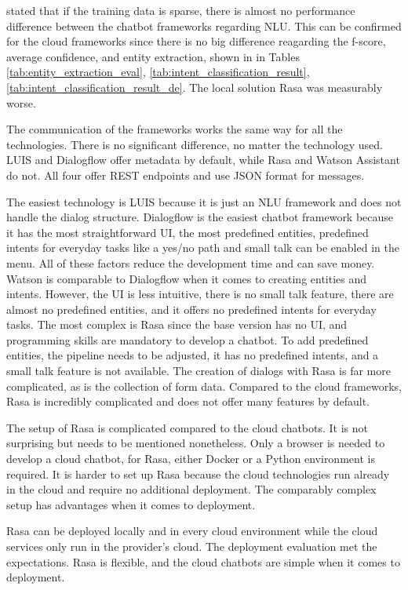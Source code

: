 \citet{braunEvaluatingNLU} stated that if the training data is sparse, there is almost no performance difference between the chatbot frameworks regarding NLU.
This can be confirmed for the cloud frameworks since there is no big difference reagarding the f-score, average confidence, and entity extraction, shown in in Tables \ref{tab:entity_extraction_eval}, \ref{tab:intent_classification_result}, \ref{tab:intent_classification_result_de}.
The local solution Rasa was measurably worse.

The communication of the frameworks works the same way for all the technologies.
There is no significant difference, no matter the technology used.
LUIS and Dialogflow offer metadata by default, while Rasa and Watson Assistant do not.
All four offer REST endpoints and use JSON format for messages.

The easiest technology is LUIS because it is just an NLU framework and does not handle the dialog structure.
Dialogflow is the easiest chatbot framework because it has the most straightforward UI, the most predefined entities,
predefined intents for everyday tasks like a yes/no path and small talk can be enabled in the menu.
All of these factors reduce the development time and can save money.
Watson is comparable to Dialogflow when it comes to creating entities and intents. However, the UI is less intuitive, there is no small talk feature, there are almost no predefined entities, and it offers no predefined intents for everyday tasks.
The most complex is Rasa since the base version has no UI, and programming skills are mandatory to develop a chatbot.
To add predefined entities, the pipeline needs to be adjusted, it has no predefined intents, and a small talk feature is not available.
The creation of dialogs with Rasa is far more complicated, as is the collection of form data.
Compared to the cloud frameworks, Rasa is incredibly complicated and does not offer many features by default.

The setup of Rasa is complicated compared to the cloud chatbots.
It is not surprising but needs to be mentioned nonetheless.
Only a browser is needed to develop a cloud chatbot, for Rasa, either Docker or a Python environment is required.
It is harder to set up Rasa because the cloud technologies run already in the cloud and require no additional deployment.
The comparably complex setup has advantages when it comes to deployment.

Rasa can be deployed locally and in every cloud environment while the cloud services only run in the provider's cloud.
The deployment evaluation met the expectations.
Rasa is flexible, and the cloud chatbots are simple when it comes to deployment.

